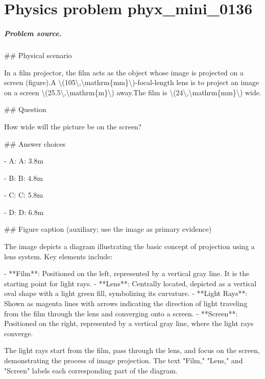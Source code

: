 
\chapter{Physics problem phyx\_mini\_0136}
\label{ch:PhyXMiniProblems_problem_phyx_mini_0136}

\paragraph{Problem source.}
\#\# Physical scenario

In a film projector, the film acts as the object whose image is projected on a screen (figure).A \textbackslash{}(105\textbackslash{},\textbackslash{}mathrm\{mm\}\textbackslash{})-focal-length lens is to project an image on a screen \textbackslash{}(25.5\textbackslash{},\textbackslash{}mathrm\{m\}\textbackslash{}) away.The film is \textbackslash{}(24\textbackslash{},\textbackslash{}mathrm\{mm\}\textbackslash{}) wide.

\#\# Question

How wide will the picture be on the screen?

\#\# Answer choices

- A: A: 3.8m

- B: B: 4.8m

- C: C: 5.8m

- D: D: 6.8m

\#\# Figure caption (auxiliary; use the image as primary evidence)

The image depicts a diagram illustrating the basic concept of projection using a lens system. Key elements include:

- **Film**: Positioned on the left, represented by a vertical gray line. It is the starting point for light rays.
- **Lens**: Centrally located, depicted as a vertical oval shape with a light green fill, symbolizing its curvature.
- **Light Rays**: Shown as magenta lines with arrows indicating the direction of light traveling from the film through the lens and converging onto a screen.
- **Screen**: Positioned on the right, represented by a vertical gray line, where the light rays converge.

The light rays start from the film, pass through the lens, and focus on the screen, demonstrating the process of image projection. The text "Film," "Lens," and "Screen" labels each corresponding part of the diagram.

